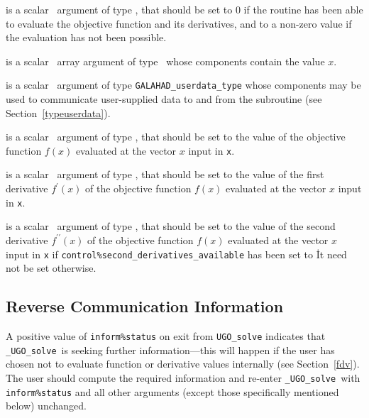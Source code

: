 \documentclass{galahad}
\newcommand{\packagename}{UGO}
\newcommand{\fullpackagename}{\libraryname\_\packagename}
\newcommand{\solver}{{\tt \fullpackagename\_solve}}
\begin{document}
\begin{description}
 is a scalar \intentout\ argument of type \integer,
that should be set to 0 if the routine has been able to evaluate
the objective function and its derivatives,
and to a non-zero value if the evaluation has not been possible.

 is a scalar \intentin\ array argument of type \realdp\
whose components contain the value $x$.

 is a scalar \intentinout\ argument of type
{\tt GALAHAD\_userdata\_type} whose components may be used
to communicate user-supplied data to and from the
subroutine (see Section~\ref{typeuserdata}).

 is a scalar \intentout\ argument of type \realdp,
that should be set to the value of the objective function $f(x)$
evaluated at the vector $x$ input in {\tt x}.

 is a scalar \intentout\ argument of type \realdp,
that should be set to the value of the first derivative
$f^{\prime}(x)$ of the objective function $f(x)$
evaluated at the vector $x$ input in {\tt x}.

 is a scalar \intentout\ argument of type \realdp,
that should be set to the value of the second derivative
$f^{\prime\prime}(x)$ of the objective function $f(x)$
evaluated at the vector $x$ input in {\tt x} if
{\tt control\%second\_derivatives\_available} has been set to \true\.
It need not be set otherwise.

\end{description}


\subsection{\label{reverse}Reverse Communication Information}

A positive value of {\tt inform\%status} on exit from
{\tt \packagename\_solve}
indicates that
\solver\ is seeking further information---this will happen
if the user has chosen not to evaluate function or
derivative values internally (see Section~\ref{fdv}).
The user should compute the required information and re-enter \solver\
with {\tt inform\%status} and all other arguments (except those specifically
mentioned below) unchanged.
\end{document}
